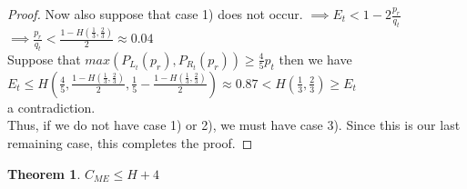 \documentclass[letterpaper,12pt,titlepage,oneside,final]{book}
\theoremstyle{plain}
\newtheorem{thm}{Theorem}[section]
\begin{document}
\begin{proof}
Now also suppose that case 1) does not occur. 
$\implies E_t < 1-2\frac{p_r}{q_t}$ \\
$\implies \frac{p_r}{q_t} < \frac{1-H(\frac{1}{3}, \frac{2}{3})}{2} \approx 0.04$ \\
Suppose that $max(P_{L_t}(p_r), P_{R_t}(p_r)) \geq \frac{4}{5} p_t$ then we have \\
$E_t \leq H(\frac{4}{5}, \frac{1-H(\frac{1}{3}, \frac{2}{3})}{2}, \frac{1}{5}-\frac{1-H(\frac{1}{3}, \frac{2}{3})}{2}) \approx 0.87 < H(\frac{1}{3}, \frac{2}{3}) \geq E_t$ \\ 
a contradiction. \\
Thus, if we do not have case 1) or 2), we must have case 3). Since this is our last remaining case, this completes the proof.
 

\end{proof}


\begin{thm}
$C_{ME} \leq H + 4$
\end{thm}
\end{document}
